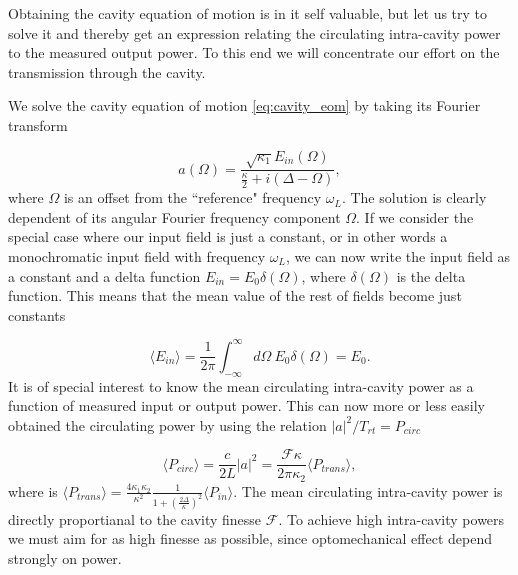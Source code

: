 Obtaining the cavity equation of motion is in it self valuable, but let us try to solve it and thereby get an expression relating the circulating intra-cavity power to the measured output power. To this end we will concentrate our effort on the transmission through the cavity.

We solve the cavity equation of motion \eqref{eq:cavity_eom} by taking its Fourier transform

\begin{equation}
a(\Omega) = \frac{\sqrt{\kappa_1}E_{in}(\Omega)}{\frac{\kappa}{2} + i(\Delta - \Omega)},
\end{equation}
\noindent
where $\Omega$ is an offset from the ``reference" frequency $\omega_L$. The solution is clearly dependent of its angular Fourier frequency component $\Omega$. If we consider the special case where our input field is just a constant, or in other words a monochromatic input field with frequency $\omega_L$, we can now write the input field as a constant and a delta function $E_{in} = E_0\delta(\Omega)$, where $\delta(\Omega)$ is the delta function. This means that the mean value of the rest of fields become just constants

\begin{equation}
\langle E_{in} \rangle = \frac{1}{2\pi}\int_{-\infty}^{\infty}d\Omega~E_0\delta(\Omega) = E_0.
\end{equation}
\noindent
It is of special interest to know the mean circulating intra-cavity power as a function of measured input or output power. This can now more or less easily obtained the circulating power by using the relation $\left| a \right|^2/T_{rt} = P_{circ}$

\begin{equation}
\langle P_{circ} \rangle = \frac{c}{2L} \left| a \right|^2 = \frac{\mathcal{F}\kappa}{2\pi\kappa_2}\langle P_{trans} \rangle,
\label{eq:cav_circ_pwr}
\end{equation}
\noindent
where is $\langle P_{trans} \rangle = \frac{4\kappa_1\kappa_2}{\kappa^2}\frac{1}{1 + \left(\frac{2\Delta}{\kappa}\right)^2}\langle P_{in} \rangle$. The mean circulating intra-cavity power is directly proportianal to the cavity finesse $\mathcal{F}$. To achieve high intra-cavity powers we must aim for as high finesse as possible, since optomechanical effect depend strongly on power.